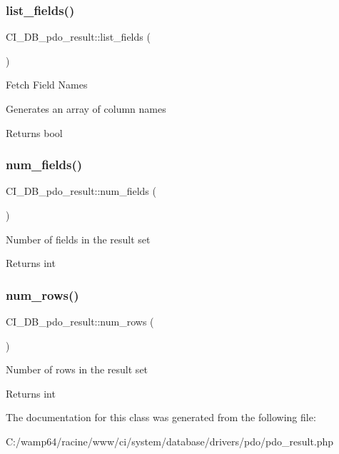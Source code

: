 \subsubsection{\texorpdfstring{list\+\_\+fields()}{list\_fields()}}
{\footnotesize\ttfamily C\+I\+\_\+\+D\+B\+\_\+pdo\+\_\+result\+::list\+\_\+fields (\begin{DoxyParamCaption}{ }\end{DoxyParamCaption})}

Fetch Field Names

Generates an array of column names

\begin{DoxyReturn}{Returns}
bool 
\end{DoxyReturn}
\mbox{\label{class_c_i___d_b__pdo__result_afff047ff4b88aa1db2e31e9d2d60664d}} 
\subsubsection{\texorpdfstring{num\+\_\+fields()}{num\_fields()}}
{\footnotesize\ttfamily C\+I\+\_\+\+D\+B\+\_\+pdo\+\_\+result\+::num\+\_\+fields (\begin{DoxyParamCaption}{ }\end{DoxyParamCaption})}

Number of fields in the result set

\begin{DoxyReturn}{Returns}
int 
\end{DoxyReturn}
\mbox{\label{class_c_i___d_b__pdo__result_ae49e35d86377eee23854b845a79a4ee8}} 
\subsubsection{\texorpdfstring{num\+\_\+rows()}{num\_rows()}}
{\footnotesize\ttfamily C\+I\+\_\+\+D\+B\+\_\+pdo\+\_\+result\+::num\+\_\+rows (\begin{DoxyParamCaption}{ }\end{DoxyParamCaption})}

Number of rows in the result set

\begin{DoxyReturn}{Returns}
int 
\end{DoxyReturn}


The documentation for this class was generated from the following file\+:\begin{DoxyCompactItemize}
\item 
C\+:/wamp64/racine/www/ci/system/database/drivers/pdo/pdo\+\_\+result.\+php\end{DoxyCompactItemize}
